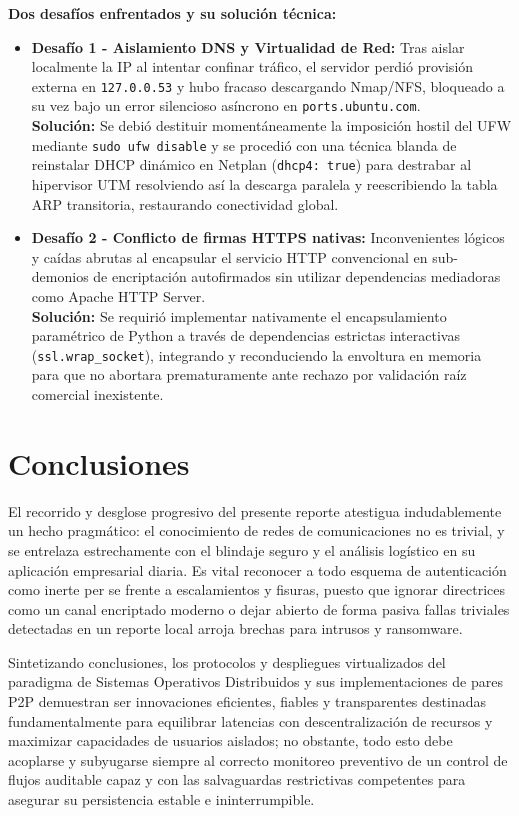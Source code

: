 \documentclass[stu, 12pt, letterpaper, donotrepeattitle, floatsintext, noapacite]{apa7}
\begin{document}
\textbf{Dos desafíos enfrentados y su solución técnica:}
\begin{itemize}
    \item \textbf{Desafío 1 - Aislamiento DNS y Virtualidad de Red:} Tras aislar localmente la IP al intentar confinar tráfico, el servidor perdió provisión externa en \texttt{127.0.0.53} y hubo fracaso descargando Nmap/NFS, bloqueado a su vez bajo un error silencioso asíncrono en \texttt{ports.ubuntu.com}. \\ \textbf{Solución:} Se debió destituir momentáneamente la imposición hostil del UFW mediante \texttt{sudo ufw disable} y se procedió con una técnica blanda de reinstalar DHCP dinámico en Netplan (\texttt{dhcp4: true}) para destrabar al hipervisor UTM resolviendo así la descarga paralela y reescribiendo la tabla ARP transitoria, restaurando conectividad global.
    \item \textbf{Desafío 2 - Conflicto de firmas HTTPS nativas:} Inconvenientes lógicos y caídas abrutas al encapsular el servicio HTTP convencional en sub-demonios de encriptación autofirmados sin utilizar dependencias mediadoras como Apache HTTP Server. \\ \textbf{Solución:} Se requirió implementar nativamente el encapsulamiento paramétrico de Python a través de dependencias estrictas interactivas (\texttt{ssl.wrap\_socket}), integrando y reconduciendo la envoltura en memoria para que no abortara prematuramente ante rechazo por validación raíz comercial inexistente.
\end{itemize}

\section{Conclusiones}

El recorrido y desglose progresivo del presente reporte atestigua indudablemente un hecho pragmático: el conocimiento de redes de comunicaciones no es trivial, y se entrelaza estrechamente con el blindaje seguro y el análisis logístico en su aplicación empresarial diaria. Es vital reconocer a todo esquema de autenticación como inerte per se frente a escalamientos y fisuras, puesto que ignorar directrices como un canal encriptado moderno o dejar abierto de forma pasiva fallas triviales detectadas en un reporte local arroja brechas para intrusos y ransomware. 

Sintetizando conclusiones, los protocolos y despliegues virtualizados del paradigma de Sistemas Operativos Distribuidos y sus implementaciones de pares P2P demuestran ser innovaciones eficientes, fiables y transparentes destinadas fundamentalmente para equilibrar latencias con descentralización de recursos y maximizar capacidades de usuarios aislados; no obstante, todo esto debe acoplarse y subyugarse siempre al correcto monitoreo preventivo de un control de flujos auditable capaz y con las salvaguardas restrictivas competentes para asegurar su persistencia estable e ininterrumpible.

\newpage

\nocite{*}   %
\printbibliography[title={Referencias}]
\end{document}
